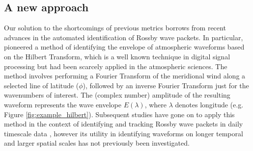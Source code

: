 \subsection{A new approach}

Our solution to the shortcomings of previous metrics borrows from recent advances in the automated identification of Rossby wave packets. In particular, \citet{Zimin2003} pioneered a method of identifying the envelope of atmospheric waveforms based on the Hilbert Transform, which is a well known technique in digital signal processing but had been scarcely applied in the atmospheric sciences. The method involves performing a Fourier Transform of the meridional wind along a selected line of latitude ($\phi$), followed by an inverse Fourier Transform just for the wavenumbers of interest. The (complex number) amplitude of the resulting waveform represents the wave envelope $E(\lambda)$, where $\lambda$ denotes longitude (e.g. Figure \ref{fig:example_hilbert}). Subsequent studies have gone on to apply this method in the context of identifying and tracking Rossby wave packets in daily timescale data \citep{Glatt2014,Souders2014a}, however its utility in identifying waveforms on longer temporal and larger spatial scales has not previously been investigated.